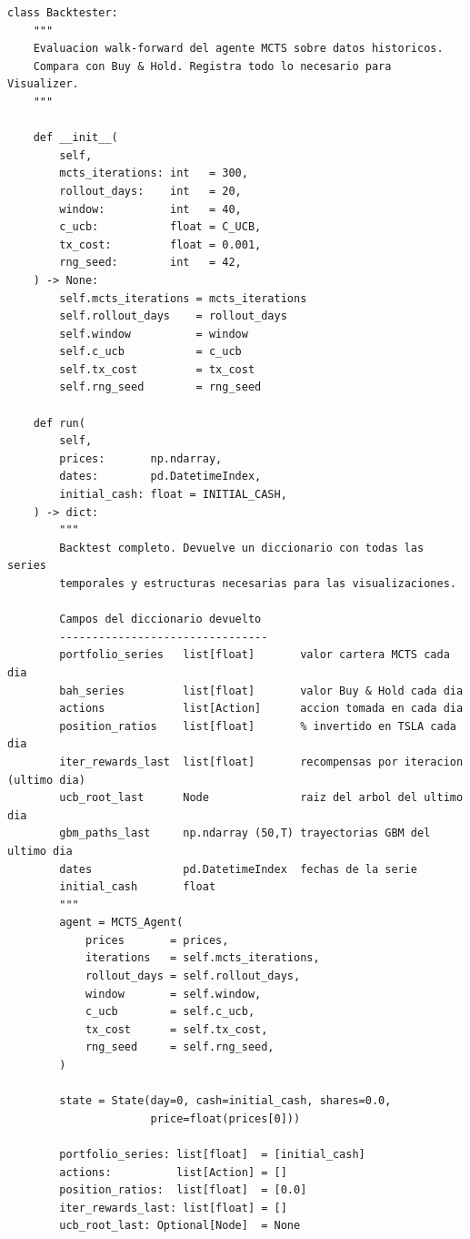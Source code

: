 \documentclass[12pt, a4paper]{article}
\begin{document}
\begin{lstlisting}[caption={Constructor y metodo \texttt{run()} del Backtester}]
class Backtester:
    """
    Evaluacion walk-forward del agente MCTS sobre datos historicos.
    Compara con Buy & Hold. Registra todo lo necesario para Visualizer.
    """

    def __init__(
        self,
        mcts_iterations: int   = 300,
        rollout_days:    int   = 20,
        window:          int   = 40,
        c_ucb:           float = C_UCB,
        tx_cost:         float = 0.001,
        rng_seed:        int   = 42,
    ) -> None:
        self.mcts_iterations = mcts_iterations
        self.rollout_days    = rollout_days
        self.window          = window
        self.c_ucb           = c_ucb
        self.tx_cost         = tx_cost
        self.rng_seed        = rng_seed

    def run(
        self,
        prices:       np.ndarray,
        dates:        pd.DatetimeIndex,
        initial_cash: float = INITIAL_CASH,
    ) -> dict:
        """
        Backtest completo. Devuelve un diccionario con todas las series
        temporales y estructuras necesarias para las visualizaciones.

        Campos del diccionario devuelto
        --------------------------------
        portfolio_series   list[float]       valor cartera MCTS cada dia
        bah_series         list[float]       valor Buy & Hold cada dia
        actions            list[Action]      accion tomada en cada dia
        position_ratios    list[float]       % invertido en TSLA cada dia
        iter_rewards_last  list[float]       recompensas por iteracion (ultimo dia)
        ucb_root_last      Node              raiz del arbol del ultimo dia
        gbm_paths_last     np.ndarray (50,T) trayectorias GBM del ultimo dia
        dates              pd.DatetimeIndex  fechas de la serie
        initial_cash       float
        """
        agent = MCTS_Agent(
            prices       = prices,
            iterations   = self.mcts_iterations,
            rollout_days = self.rollout_days,
            window       = self.window,
            c_ucb        = self.c_ucb,
            tx_cost      = self.tx_cost,
            rng_seed     = self.rng_seed,
        )

        state = State(day=0, cash=initial_cash, shares=0.0,
                      price=float(prices[0]))

        portfolio_series: list[float]  = [initial_cash]
        actions:          list[Action] = []
        position_ratios:  list[float]  = [0.0]
        iter_rewards_last: list[float] = []
        ucb_root_last: Optional[Node]  = None


\end{lstlisting}
\end{document}
